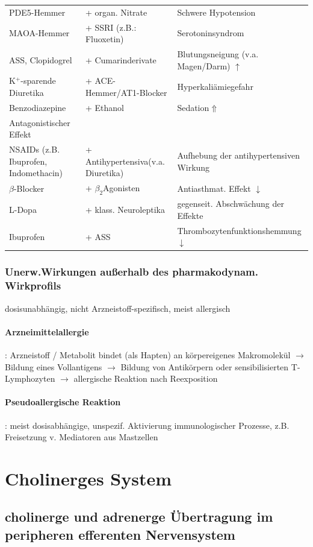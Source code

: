 \documentclass[10pt,a4paper]{report}
\begin{document}
\begin{tabularx}{\textwidth}{XXX}
PDE5-Hemmer&+ organ. Nitrate&Schwere Hypotension\\
MAOA-Hemmer&+ SSRI (z.B.: Fluoxetin)&Serotoninsyndrom\\
ASS, Clopidogrel&+ Cumarinderivate&Blutungsneigung (v.a. Magen/Darm) $\uparrow$\\
K$^+$-sparende Diuretika&+ ACE-Hemmer/AT1-Blocker&Hyperkaliämiegefahr\\
Benzodiazepine&+ Ethanol&Sedation$\Uparrow$\\
Antagonistischer Effekt&&\\
NSAIDs (z.B. Ibuprofen, Indomethacin)&+ Antihypertensiva(v.a. Diuretika)&Aufhebung der antihypertensiven Wirkung\\
$\beta$-Blocker&+ $\beta_2$Agonisten&Antiasthmat. Effekt $\downarrow$\\
L-Dopa&+ klass. Neuroleptika&gegenseit. Abschwächung der Effekte\\
Ibuprofen&+ ASS&Thrombozytenfunktionshemmung $\downarrow$\\
\end{tabularx}
\subsection{Unerw.Wirkungen außerhalb des pharmakodynam. Wirkprofils}
dosisunabhängig, nicht Arzneistoff-spezifisch, meist allergisch\\
\subsubsection{Arzneimittelallergie}: Arzneistoff / Metabolit bindet (als Hapten) an körpereigenes Makromolekül $\rightarrow$ Bildung eines Vollantigens $\rightarrow$ Bildung von Antikörpern oder sensibilisierten T-Lymphozyten $\rightarrow$ allergische Reaktion nach Reexposition
\subsubsection{Pseudoallergische Reaktion}: meist dosisabhängige, unspezif. Aktivierung immunologischer Prozesse, z.B. Freisetzung v. Mediatoren aus Mastzellen 
\chapter{Cholinerges System}
\section{cholinerge und adrenerge Übertragung im peripheren efferenten Nervensystem}
\end{document}

